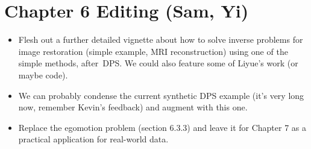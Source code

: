 \documentclass{article}
\begin{document}
\begin{itemize}
\end{itemize}

\section{Chapter 6 Editing (Sam, Yi)}
\begin{itemize}
    \item Flesh out a further detailed vignette about how to solve inverse problems for image restoration (simple example, MRI reconstruction) using one of the simple methods, after\ DPS. We could also feature some of Liyue's work (or maybe code).
    \item We can probably condense the current synthetic DPS example (it's very long now, remember Kevin's feedback) and augment with this one.
    \item Replace the egomotion problem (section 6.3.3) and leave it for Chapter 7 as a practical application for real-world data. 
\end{itemize}
\end{document}
